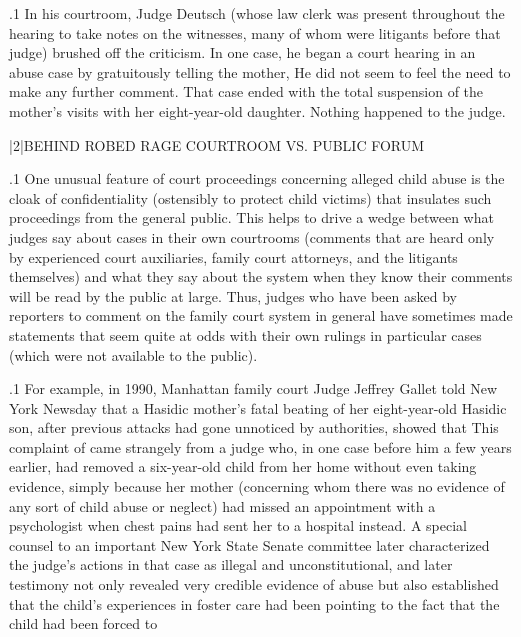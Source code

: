 \documentclass[11pt, twoside]{article}
\begin{document}
{\p.1{%
In his courtroom, Judge Deutsch (whose law clerk was present
throughout the hearing to take notes on the witnesses, many of whom
were litigants before that judge) brushed off the criticism. In one case, he
began a court hearing in an abuse case by gratuitously telling the mother,
 He did
not seem to feel the need to make any further comment. That case ended
with the total suspension of the mother’s visits with her eight-year-old
daughter. Nothing happened to the judge.
}%


\s|2|{BEHIND ROBED RAGE\raiseColon{} COURTROOM VS. PUBLIC FORUM}

\p.1{%
\noindent{}One unusual feature of court proceedings concerning alleged child
abuse is the cloak of confidentiality (ostensibly to protect child victims) that insulates such proceedings from the general public. This helps
to drive a wedge between what judges say about cases in their own
courtrooms (comments that are heard only by experienced court auxiliaries, family court attorneys, and the litigants themselves) and what
they say about the system when they know their comments will be read
by the public at large. Thus, judges who have been asked by reporters to
comment on the family court system in general have sometimes made
statements that seem quite at odds with their own rulings in particular
cases (which were not available to the public).
}%

\p.1{%
For example, in 1990, Manhattan family court Judge Jeffrey Gallet
told New York Newsday that a Hasidic mother’s fatal beating of her
eight-year-old Hasidic son, after previous attacks had gone unnoticed by
authorities, showed that 
This complaint of  came strangely from a judge
who, in one case before him a few years earlier, had removed
a six-year-old child from her home without even taking evidence, simply because
her mother (concerning whom there was no evidence of any sort of
child abuse or neglect) had missed an appointment with a psychologist
when chest pains had sent her to a hospital instead. A special counsel to
an important New York State Senate committee later characterized the
judge’s actions in that case as illegal and unconstitutional, and later
testimony not only revealed very credible evidence of abuse but also
established that the child’s experiences in foster care had been  pointing to the fact that the child had been forced to 
}%

}
\end{document}
